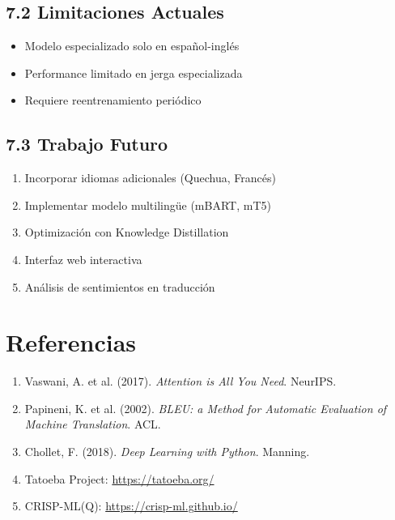 \documentclass[12pt,a4paper]{article}
\begin{document}
\subsection{7.2 Limitaciones Actuales}
\begin{itemize}
    \item Modelo especializado solo en español-inglés
    \item Performance limitado en jerga especializada
    \item Requiere reentrenamiento periódico
\end{itemize}

\subsection{7.3 Trabajo Futuro}
\begin{enumerate}
    \item Incorporar idiomas adicionales (Quechua, Francés)
    \item Implementar modelo multilingüe (mBART, mT5)
    \item Optimización con Knowledge Distillation
    \item Interfaz web interactiva
    \item Análisis de sentimientos en traducción
\end{enumerate}

\section{Referencias}

\begin{enumerate}
    \item Vaswani, A. et al. (2017). \textit{Attention is All You Need}. NeurIPS.
    \item Papineni, K. et al. (2002). \textit{BLEU: a Method for Automatic Evaluation of Machine Translation}. ACL.
    \item Chollet, F. (2018). \textit{Deep Learning with Python}. Manning.
    \item Tatoeba Project: \url{https://tatoeba.org/}
    \item CRISP-ML(Q): \url{https://crisp-ml.github.io/}
\end{enumerate}
\end{document}
